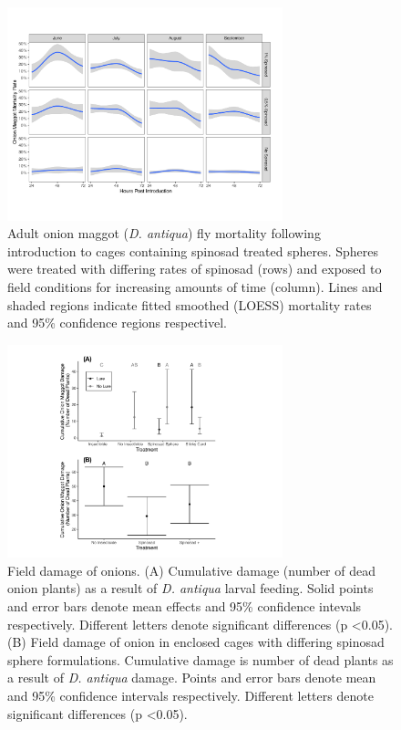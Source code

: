 \documentclass[num-refs]{wiley-article}
\begin{document}
\begin{figure}[bt]
\centering
\includegraphics[width = 8cm]{figures/final-figures/figure-3.pdf}
\caption{Adult onion maggot (\textit{D. antiqua}) fly mortality following introduction to cages containing spinosad treated spheres.  Spheres were treated with differing rates of spinosad (rows) and exposed to field conditions for increasing amounts of time (column).  Lines and shaded regions indicate fitted smoothed (LOESS) mortality rates and 95\% confidence regions respectivel.  }
\label{fig:figure3}
\end{figure}


\begin{figure}[bt]
\centering
\includegraphics[width = 8cm]{figures/final-figures/figure-4.pdf}
\caption{Field damage of onions.  (A) Cumulative damage (number of dead onion plants) as a result of \textit{D. antiqua} larval feeding.  Solid points and error bars denote mean effects and 95\% confidence intevals respectively.  Different letters denote significant differences (p \textless 0.05).  (B) Field damage of onion in enclosed cages with differing spinosad sphere formulations.  Cumulative damage is number of dead plants as a result of \textit{D. antiqua} damage.  Points and error bars denote mean and 95\% confidence intervals respectively.  Different letters denote significant differences (p \textless 0.05). } 
\label{fig:figure4}
\end{figure}
\end{document}
